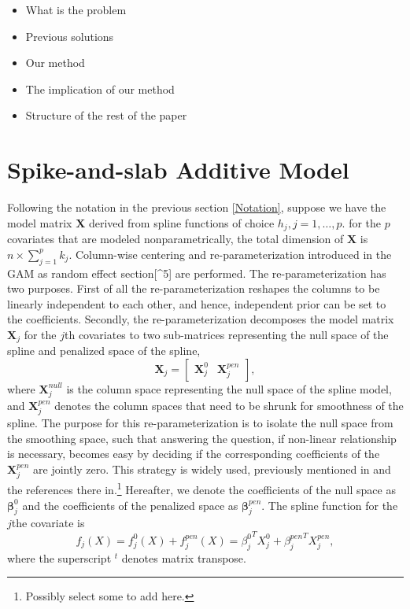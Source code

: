 \documentclass[AMA,STIX1COL,]{WileyNJD-v2}
\providecommand{\tightlist}{%
  \setlength{\itemsep}{0pt}\setlength{\parskip}{0pt}}
\begin{document}
\begin{itemize}
\tightlist
\item
  What is the problem
\item
  Previous solutions
\item
  Our method
\item
  The implication of our method
\item
  Structure of the rest of the paper
\end{itemize}

\hypertarget{spike-and-slab-additive-model}{%
\section{Spike-and-slab Additive
Model}\label{spike-and-slab-additive-model}}

Following the notation in the previous section \ref{Notation}, suppose
we have the model matrix \(\boldsymbol{X}\) derived from spline
functions of choice \(h_j, j = 1, \dots, p.\) for the \(p\) covariates
that are modeled nonparametrically, the total dimension of
\(\boldsymbol{X}\) is \(n \times \sum\limits_{j=1}^p k_j\). Column-wise
centering and re-parameterization introduced in the GAM as random effect
section{[}\^{}5{]} are performed. The re-parameterization has two
purposes. First of all the re-parameterization reshapes the columns to
be linearly independent to each other, and hence, independent prior can
be set to the coefficients. Secondly, the re-parameterization decomposes
the model matrix \(\boldsymbol{X}_j\) for the \(j\)th covariates to two
sub-matrices representing the null space of the spline and penalized
space of the spline, \[
\boldsymbol{X}_j = \begin{bmatrix}
\boldsymbol{X}_j^{0} & \boldsymbol{X}_j^{pen}
\end{bmatrix},
\] where \(\boldsymbol{X}_j^{null}\) is the column space representing
the null space of the spline model, and \(\boldsymbol{X}_j^{pen}\)
denotes the column spaces that need to be shrunk for smoothness of the
spline. The purpose for this re-parameterization is to isolate the null
space from the smoothing space, such that answering the question, if
non-linear relationship is necessary, becomes easy by deciding if the
corresponding coefficients of the \(\boldsymbol{X}_j^{pen}\) are jointly
zero. This strategy is widely used, previously mentioned in
\citet{Scheipl2012} and the references there in.\footnote{Possibly
  select some to add here.} Hereafter, we denote the coefficients of the
null space as \(\boldsymbol{\beta}^{0}_j\) and the coefficients of the
penalized space as \(\boldsymbol{\beta}^{pen}_j\). The spline function
for the \(j\)the covariate is \[
f_j(X) = f_j^0(X) + f_j^{pen}(X) = {\beta_j^0}^T X_j^0 + {\beta_j^{pen}}^T X_j^{pen},
\] where the superscript \(^t\) denotes matrix transpose.
\end{document}
